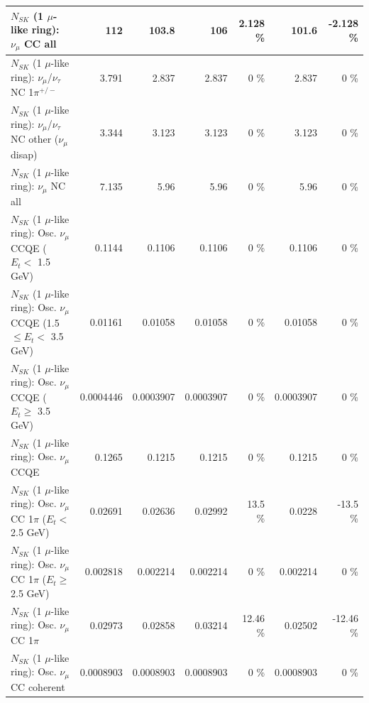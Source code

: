 \begin{table}
\begin{tabular}{| l | r | r | r  r | r  r |}
                                $N_{SK}$ (1 $\mu$-like ring): $\nu_{\mu}$ CC all &             112 &           103.8 &             106 &    2.128 \%  &           101.6 &   -2.128 \%  \\ 
\hline
              $N_{SK}$ (1 $\mu$-like ring): $\nu_\mu$/$\nu_\tau$ NC 1$\pi^{+/-}$ &           3.791 &           2.837 &           2.837 &        0 \%  &           2.837 &        0 \%  \\ 
   $N_{SK}$ (1 $\mu$-like ring): $\nu_\mu$/$\nu_\tau$ NC other ($\nu_\mu$ disap) &           3.344 &           3.123 &           3.123 &        0 \%  &           3.123 &        0 \%  \\ 
                                $N_{SK}$ (1 $\mu$-like ring): $\nu_{\mu}$ NC all &           7.135 &            5.96 &            5.96 &        0 \%  &            5.96 &        0 \%  \\ 
\hline
\hline
           $N_{SK}$ (1 $\mu$-like ring): Osc. $\nu_\mu$ CCQE ($E_{t} <$ 1.5 GeV) &          0.1144 &          0.1106 &          0.1106 &        0 \%  &          0.1106 &        0 \%  \\ 
  $N_{SK}$ (1 $\mu$-like ring): Osc. $\nu_\mu$ CCQE (1.5 $\leq E_{t} <$ 3.5 GeV) &         0.01161 &         0.01058 &         0.01058 &        0 \%  &         0.01058 &        0 \%  \\ 
        $N_{SK}$ (1 $\mu$-like ring): Osc. $\nu_\mu$ CCQE ($E_{t} \geq$ 3.5 GeV) &       0.0004446 &       0.0003907 &       0.0003907 &        0 \%  &       0.0003907 &        0 \%  \\ 
\hline
                               $N_{SK}$ (1 $\mu$-like ring): Osc. $\nu_\mu$ CCQE &          0.1265 &          0.1215 &          0.1215 &        0 \%  &          0.1215 &        0 \%  \\ 
\hline
      $N_{SK}$ (1 $\mu$-like ring): Osc. $\nu_\mu$ CC 1$\pi$ ($E_{t} <$ 2.5 GeV) &         0.02691 &         0.02636 &         0.02992 &     13.5 \%  &          0.0228 &    -13.5 \%  \\ 
   $N_{SK}$ (1 $\mu$-like ring): Osc. $\nu_\mu$ CC 1$\pi$ ($E_{t} \geq$ 2.5 GeV) &        0.002818 &        0.002214 &        0.002214 &        0 \%  &        0.002214 &        0 \%  \\ 
\hline
                          $N_{SK}$ (1 $\mu$-like ring): Osc. $\nu_\mu$ CC 1$\pi$ &         0.02973 &         0.02858 &         0.03214 &    12.46 \%  &         0.02502 &   -12.46 \%  \\ 
                        $N_{SK}$ (1 $\mu$-like ring): Osc. $\nu_\mu$ CC coherent &       0.0008903 &       0.0008903 &       0.0008903 &        0 \%  &       0.0008903 &        0 \%  \\ 

\end{tabular}
\end{table}
